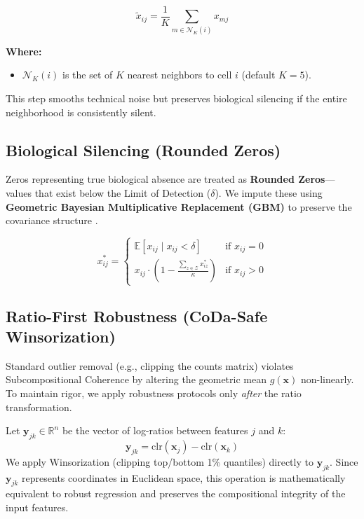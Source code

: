 \documentclass[11pt, a4paper]{article}
\begin{document}
\begin{equation}
\tilde{x}_{ij} = \frac{1}{K} \sum_{m \in \mathcal{N}_K(i)} x_{mj}
\end{equation}

\noindent\textbf{Where:}
\begin{itemize}
    \item $\mathcal{N}_K(i)$ is the set of $K$ nearest neighbors to cell $i$ (default $K=5$).
\end{itemize}
This step smooths technical noise but preserves biological silencing if the entire neighborhood is consistently silent.

\subsection{Biological Silencing (Rounded Zeros)}
Zeros representing true biological absence are treated as \textbf{Rounded Zeros}---values that exist below the Limit of Detection ($\delta$). We impute these using \textbf{Geometric Bayesian Multiplicative Replacement (GBM)} to preserve the covariance structure \citep{martin2015}.

\begin{equation}
x_{ij}^* = \begin{cases} 
\mathbb{E}[x_{ij} \mid x_{ij} < \delta] & \text{if } x_{ij} = 0 \\ 
x_{ij} \cdot \left(1 - \frac{\sum_{z \in \mathcal{Z}} x_{iz}^*}{\kappa}\right) & \text{if } x_{ij} > 0 
\end{cases}
\end{equation}

\subsection{Ratio-First Robustness (CoDa-Safe Winsorization)}
Standard outlier removal (e.g., clipping the counts matrix) violates Subcompositional Coherence by altering the geometric mean $g(\mathbf{x})$ non-linearly. To maintain rigor, we apply robustness protocols only \textit{after} the ratio transformation.

Let $\mathbf{y}_{jk} \in \mathbb{R}^n$ be the vector of log-ratios between features $j$ and $k$:
\begin{equation}
    \mathbf{y}_{jk} = \text{clr}(\mathbf{x}_j) - \text{clr}(\mathbf{x}_k)
\end{equation}
We apply Winsorization (clipping top/bottom 1\% quantiles) directly to $\mathbf{y}_{jk}$. Since $\mathbf{y}_{jk}$ represents coordinates in Euclidean space, this operation is mathematically equivalent to robust regression and preserves the compositional integrity of the input features.
\end{document}
